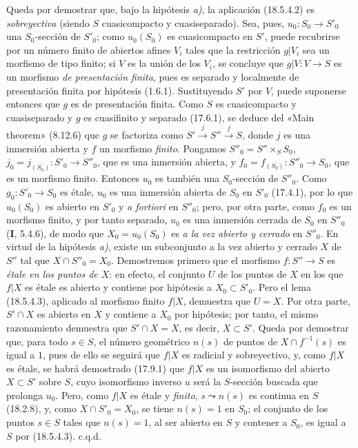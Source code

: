 Queda por demostrar que, bajo la hipótesis \emph{a)}, la aplicación (18.5.4.2) es \emph{sobreyectiva} (siendo $S$ cuasicompacto y cuasiseparado). Sea, pues, $u_0:S_0\to S'_0$ una $S_0$-sección de $S'_0$; como $u_0(S_0)$ es cuasicompacto en $S'$, puede recubrirse por un número finito de abiertos 
afines $V_i$ tales que la restricción $g|V_i$ sea un morfismo de tipo finito; si $V$ es la unión de los $V_i$, se concluye que $g|V:V\to S$ es un morfismo \emph{de presentación finita}, pues es separado y localmente de presentación finita por hipótesis (1.6.1). Sustituyendo $S'$ por $V$, puede suponerse entonces que $g$ es de presentación finita. Como $S$ es cuasicompacto y cuasiseparado y $g$ es cuasifinito y separado (17.6.1), se deduce del «Main theorem» (8.12.6) que $g$ se factoriza como $S'\xrightarrow{j}S''\xrightarrow{f}S$, donde $j$ es una inmersión abierta y $f$ un morfismo \emph{finito}. Pongamos $S''_0=S''\times_S S_0$, $j_0=j_{(S_0)}:S'_0\to S''_0$, que es una inmersión abierta, y $f_0=f_{(S_0)}:S''_0\to S_0$, que es un morfismo finito. Entonces $u_0$ es también una $S_0$-sección de $S''_0$. Como $g_0:S'_0\to S_0$ es étale, $u_0$ es una inmersión abierta de $S_0$ en $S'_0$ (17.4.1), por lo que $u_0(S_0)$ es abierto en $S'_0$ y \emph{a fortiori} en $S''_0$; pero, por otra parte, como $f_0$ es un morfismo finito, y por tanto separado, $u_0$ es una inmersión cerrada de $S_0$ en $S''_0$ (\textbf I, 5.4.6), de modo que $X_0=u_0(S_0)$ es \emph{a la vez abierto y cerrado} en $S''_0$. En virtud de la hipótesis \emph{a)}, existe un subconjunto a la vez abierto y cerrado $X$ de $S''$ tal que $X\cap S''_0=X_0$. Demostremos primero que el morfismo $f:S''\to S$ es \emph{étale en los puntos de $X$}: en efecto, el conjunto $U$ de los puntos de $X$ en los que $f|X$ es étale es abierto y contiene por hipótesis a $X_0\subset S'_0$. Pero el lema (18.5.4.3), aplicado al morfismo finito $f|X$, demuestra que $U=X$. Por otra parte, $S'\cap X$ es abierto en $X$ y contiene a $X_0$ por hipótesis; por tanto, el mismo razonamiento demuestra que $S'\cap X=X$, es decir, $X\subset S'$. Queda por demostrar que, para todo $s\in S$, el número geométrico $n(s)$ de puntos de $X\cap f^{-1}(s)$ es igual a $1$, pues de ello se seguirá que $f|X$ es radicial y sobreyectivo, y, como $f|X$ es étale, se habrá demostrado (17.9.1) que $f|X$ es un isomorfismo del abierto $X\subset S'$ sobre $S$, cuyo isomorfismo inverso $u$ será la $S$-sección buscada que prolonga $u_0$. Pero, como $f|X$ es étale y \emph{finito}, $s\leadsto n(s)$ es continua en $S$ (18.2.8), y, como $X\cap S'_0=X_0$, se tiene $n(s)=1$ en $S_0$; el conjunto de los puntos $s\in S$ tales que $n(s)=1$, al ser abierto en $S$ y contener a $S_0$, es igual a $S$ por (18.5.4.3). c.q.d.

